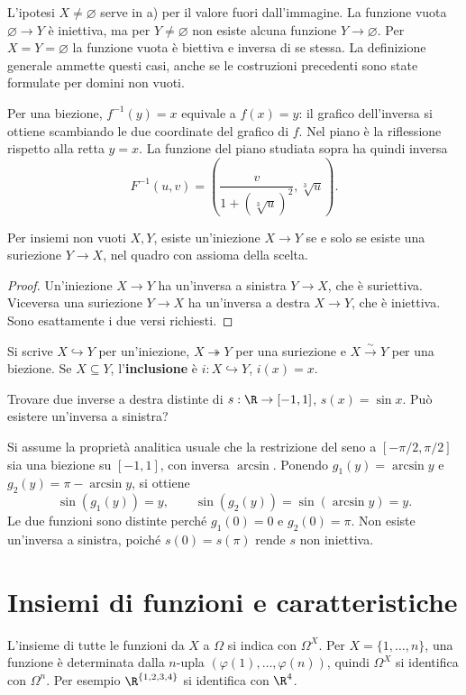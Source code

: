 \begin{osservazione}
L'ipotesi $X\ne\varnothing$ serve in a) per il valore fuori dall'immagine. La funzione vuota $\varnothing\to Y$ è iniettiva, ma per $Y\ne\varnothing$ non esiste alcuna funzione $Y\to\varnothing$. Per $X=Y=\varnothing$ la funzione vuota è biettiva e inversa di se stessa. La definizione generale ammette questi casi, anche se le costruzioni precedenti sono state formulate per domini non vuoti.
\end{osservazione}

Per una biezione, $f^{-1}(y)=x$ equivale a $f(x)=y$: il grafico dell'inversa si ottiene scambiando le due coordinate del grafico di $f$. Nel piano è la riflessione rispetto alla retta $y=x$. La funzione del piano studiata sopra ha quindi inversa
\[
F^{-1}(u,v)=\left(\frac{v}{1+(\sqrt[3]u)^2},\sqrt[3]u\right).
\]

\begin{corollario}
Per insiemi non vuoti $X,Y$, esiste un'iniezione $X\to Y$ se e solo se esiste una suriezione $Y\to X$, nel quadro con assioma della scelta.
\end{corollario}
\begin{proof}
Un'iniezione $X\to Y$ ha un'inversa a sinistra $Y\to X$, che è suriettiva. Viceversa una suriezione $Y\to X$ ha un'inversa a destra $X\to Y$, che è iniettiva. Sono esattamente i due versi richiesti.
\end{proof}

Si scrive $X\hookrightarrow Y$ per un'iniezione, $X\twoheadrightarrow Y$ per una suriezione e $X\xrightarrow{\sim}Y$ per una biezione. Se $X\subseteq Y$, l'\textbf{inclusione} è $i:X\hookrightarrow Y$, $i(x)=x$.

\begin{esercizio}
Trovare due inverse a destra distinte di $s:\R\to[-1,1]$, $s(x)=\sin x$. Può esistere un'inversa a sinistra?
\end{esercizio}
\begin{svolgimento}
Si assume la proprietà analitica usuale che la restrizione del seno a $[-\pi/2,\pi/2]$ sia una biezione su $[-1,1]$, con inversa $\arcsin$. Ponendo $g_1(y)=\arcsin y$ e $g_2(y)=\pi-\arcsin y$, si ottiene
\[
\sin(g_1(y))=y,\qquad \sin(g_2(y))=\sin(\arcsin y)=y.
\]
Le due funzioni sono distinte perché $g_1(0)=0$ e $g_2(0)=\pi$. Non esiste un'inversa a sinistra, poiché $s(0)=s(\pi)$ rende $s$ non iniettiva.
\end{svolgimento}

\section{Insiemi di funzioni e caratteristiche}
\begin{definizione}
L'insieme di tutte le funzioni da $X$ a $\Omega$ si indica con $\Omega^X$. Per $X=\{1,\ldots,n\}$, una funzione è determinata dalla $n$-upla $(\varphi(1),\ldots,\varphi(n))$, quindi $\Omega^X$ si identifica con $\Omega^n$. Per esempio $\R^{\{1,2,3,4\}}$ si identifica con $\R^4$.
\end{definizione}

